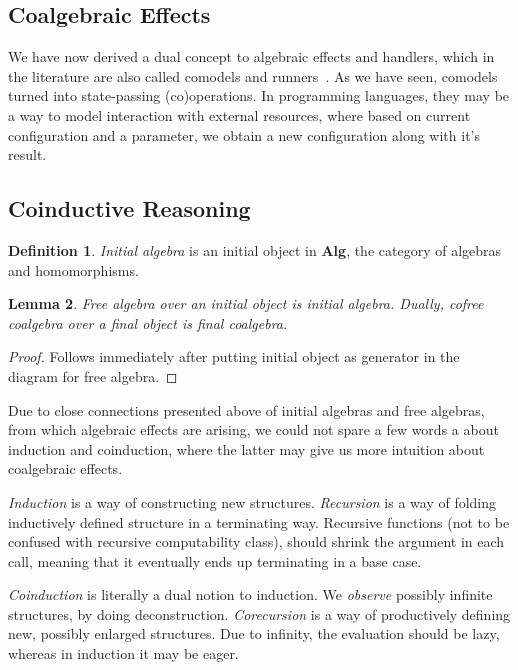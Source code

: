 \documentclass[declaration,shortabstract]{iithesis}
\theoremstyle{definition} \newtheorem{definition}{Definition}[chapter]
\theoremstyle{remark} \newtheorem{remark}[definition]{Observation}
\theoremstyle{plain} \newtheorem{theorem}[definition]{Theorem}
\theoremstyle{plain} \newtheorem{lemma}[definition]{Lemma}
\begin{document}
    \subsection{Coalgebraic Effects}

    We have now derived a dual concept to algebraic effects and handlers, which
    in the literature are also called comodels and runners~\cite{runners-uustalu, runners-in-action}.
    As we have seen, comodels turned into state-passing (co)operations.
    In programming languages, they may be a way to model interaction with external
    resources, where based on current configuration and a parameter, we
    obtain a new configuration along with it's result.

    \subsection{Coinductive Reasoning}\label{subsec:coinduction}

    \begin{definition}
        \textit{Initial algebra} is an initial object in \textbf{Alg}, the category of algebras
        and homomorphisms.
    \end{definition}

    \begin{lemma}
        Free algebra over an initial object is initial algebra. Dually,
        cofree coalgebra over a final object is final coalgebra.
    \end{lemma}
    \begin{proof}
        Follows immediately after putting initial object as generator in the
        diagram for free algebra.
    \end{proof}

    Due to close connections presented above of initial algebras and free
    algebras, from which algebraic effects are arising, we could not spare
    a few words a about induction and coinduction, where the latter may give
    us more intuition about coalgebraic effects.

    \textit{Induction} is a way of constructing new structures. \textit{Recursion} is
    a way of folding inductively defined structure in a terminating way. Recursive
    functions (not to be confused with recursive computability class), should
    shrink the argument in each call, meaning that it eventually ends up
    terminating in a base case.

    \textit{Coinduction} is literally a dual notion to induction. We \textit{observe}
    possibly infinite structures, by doing deconstruction. \textit{Corecursion}
    is a way of productively defining new, possibly enlarged structures. Due to
    infinity, the evaluation should be lazy, whereas in induction it may be eager.
\end{document}

